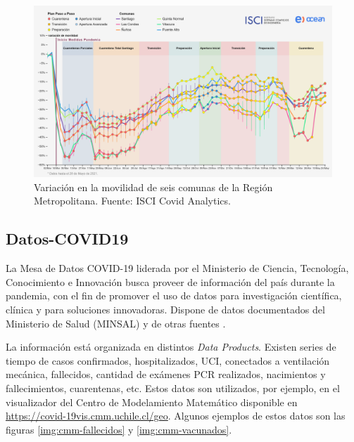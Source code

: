 \begin{figure}[H]
\centering
\includegraphics[width=\textwidth]{img/metodologia/datos/ISCI-movilidad-RM.png}
\caption{Variación en la movilidad de seis comunas de la Región Metropolitana. Fuente: ISCI Covid Analytics.}
\label{img:ISCI-movilidad-RM}
\end{figure}




\subsection{Datos-COVID19}\label{sec:datos-minsal}

La Mesa de Datos COVID-19 liderada por el Ministerio de Ciencia, Tecnología, Conocimiento e Innovación busca proveer de información del país durante la pandemia, con el fin de promover el uso de datos para investigación científica, clínica y para soluciones innovadoras. Dispone de datos documentados del Ministerio de Salud (MINSAL) y de otras fuentes \cite{MINCIENCIA}.

La información está organizada en distintos \textit{Data Products}. Existen series de tiempo de casos confirmados, hospitalizados, UCI, conectados a ventilación mecánica, fallecidos, cantidad de exámenes PCR realizados, nacimientos y fallecimientos, cuarentenas, etc. Estos datos son utilizados, por ejemplo, en el visualizador del Centro de Modelamiento Matemático disponible en \url{https://covid-19vis.cmm.uchile.cl/geo}. Algunos ejemplos de estos datos son las figuras \ref{img:cmm-fallecidos} y \ref{img:cmm-vacunados}.


